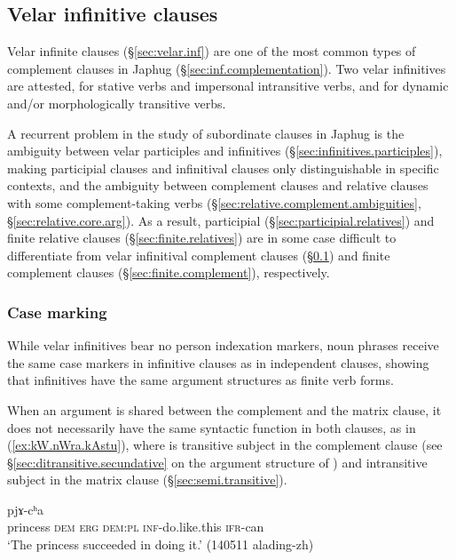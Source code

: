 \subsection{Velar infinitive clauses} \label{sec:velar.infinitives.complement.clauses}
 
Velar infinite clauses (§\ref{sec:velar.inf}) are one of the most common types of complement clauses in Japhug (§\ref{sec:inf.complementation}). Two velar infinitives are attested,  for stative verbs and impersonal intransitive verbs, and  for dynamic and/or morphologically transitive verbs. 

A recurrent problem in the study of subordinate clauses in Japhug is the ambiguity between velar participles and infinitives (§\ref{sec:infinitives.participles}), making participial clauses and infinitival clauses only distinguishable in specific contexts, and the ambiguity between complement clauses and relative clauses with some com\-ple\-ment-taking verbs (§\ref{sec:relative.complement.ambiguities}, §\ref{sec:relative.core.arg}). As a result, participial (§\ref{sec:participial.relatives}) and finite  relative clauses  (§\ref{sec:finite.relatives}) are in some case difficult to differentiate from velar infinitival complement clauses (§\ref{sec:velar.infinitives.complement.clauses}) and finite complement clauses  (§\ref{sec:finite.complement}), respectively. 


\subsubsection{Case marking} \label{sec:case.infinitive}
While velar infinitives bear no person indexation markers, noun phrases receive the same case markers in infinitive clauses as in independent clauses, showing that infinitives have the same argument structures as finite verb forms.

When an argument is shared between the complement and the matrix clause, it does not necessarily have the same syntactic function in both clauses, as in (\ref{ex:kW.nWra.kAstu}), where  is transitive subject in the complement clause (see §\ref{sec:ditransitive.secundative} on the argument structure of ) and intransitive subject in the matrix clause (§\ref{sec:semi.transitive}). 

\begin{exe}
\ex \label{ex:kW.nWra.kAstu}
 pjɤ-cʰa \\
princess \textsc{dem} \textsc{erg} \textsc{dem}:\textsc{pl} \textsc{inf}-do.like.this \textsc{ifr}-can \\
\glt `The princess succeeded in doing it.' (140511 alading-zh)
\end{exe}

